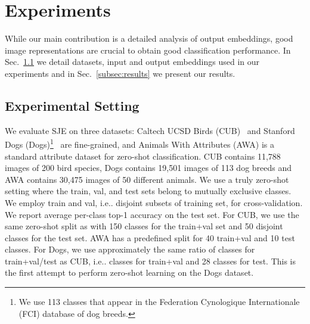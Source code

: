 \documentclass[10pt,twocolumn,letterpaper]{article}
\makeatletter
\newcommand{\SJE}{SJE\xspace}
\DeclareRobustCommand\onedot{\futurelet\@let@token\@onedot}
\def\@onedot{\ifx\@let@token.\else.\null\fi\xspace}
\def\ie{{i.e}\onedot} \def\Ie{{I.e}\onedot}
\makeatother
\begin{document}
 





\section{Experiments}
\label{sec:exp}

While our main contribution is a detailed analysis of output embeddings, good image representations are crucial to obtain good classification performance. 
In Sec.~\ref{subsec:setting} we detail datasets, input and output embeddings used in our experiments and in Sec.~\ref{subsec:results} we present our results.

\subsection{Experimental Setting}
\label{subsec:setting}

We evaluate \SJE on three datasets: Caltech UCSD Birds (CUB)~\cite{WBPB11} and Stanford Dogs (Dogs)\footnote{We use 113 classes that appear in the Federation Cynologique Internationale (FCI) database of dog breeds.}~\cite{StanfordDogsDataset} are fine-grained, and Animals With Attributes (AWA) \cite{LNH13} is a standard attribute dataset for zero-shot classification. 
CUB contains 11,788 images of 200 bird species, Dogs contains 19,501 images of 113 dog breeds and AWA contains 30,475 images of 50 different animals. 
We use a truly zero-shot setting where the train, val, and test sets belong to mutually exclusive classes. We employ train and val, \ie disjoint subsets of training set, for cross-validation. We report average per-class top-1 accuracy on the test set. For CUB, we use the same zero-shot split as \cite{APHS13} with 150 classes for the train+val set and 50 disjoint classes for the test set. AWA has a predefined split for 40 train+val and 10 test classes. For Dogs, we use approximately the same ratio of classes for train+val/test as CUB, \ie 85 classes for train+val and 28 classes for test. This is the first attempt to perform zero-shot learning on the Dogs dataset.
\end{document}
